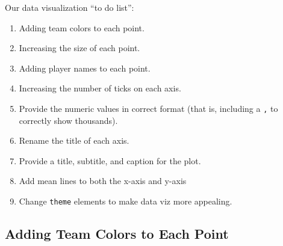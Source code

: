 \documentclass[
  letterpaper,
]{krantz}
\providecommand{\tightlist}{%
  \setlength{\itemsep}{0pt}\setlength{\parskip}{0pt}}\usepackage{longtable,booktabs,array}
\begin{document}
\begin{tcolorbox}[enhanced jigsaw, colback=white, leftrule=.75mm, breakable, colframe=quarto-callout-note-color-frame, bottomtitle=1mm, rightrule=.15mm, left=2mm, opacityback=0, bottomrule=.15mm, arc=.35mm, coltitle=black, colbacktitle=quarto-callout-note-color!10!white, toptitle=1mm, titlerule=0mm, title=\textcolor{quarto-callout-note-color}{\faInfo}\hspace{0.5em}{Note}, toprule=.15mm, opacitybacktitle=0.6]

Our data visualization ``to do list'':

\begin{enumerate}
\def\labelenumi{\arabic{enumi}.}
\tightlist
\item
  Adding team colors to each point.
\item
  Increasing the size of each point.
\item
  Adding player names to each point.
\item
  Increasing the number of ticks on each axis.
\item
  Provide the numeric values in correct format (that is, including a
  \texttt{,} to correctly show thousands).
\item
  Rename the title of each axis.
\item
  Provide a title, subtitle, and caption for the plot.
\item
  Add mean lines to both the x-axis and y-axis
\item
  Change \texttt{theme} elements to make data viz more appealing.
\end{enumerate}

\end{tcolorbox}

\hypertarget{adding-team-colors-to-each-point}{%
\subsection{Adding Team Colors to Each
Point}\label{adding-team-colors-to-each-point}}
\end{document}
